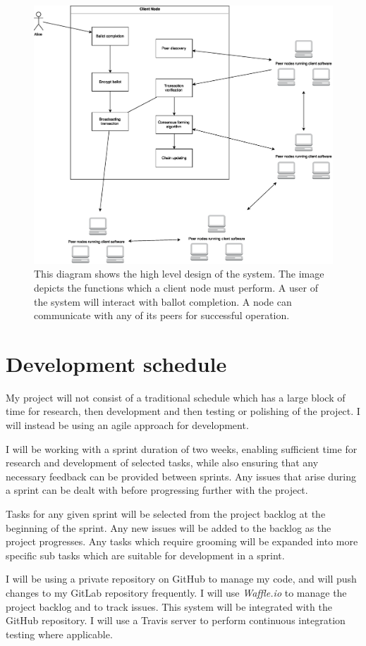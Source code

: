 \documentclass[a4paper,12pt]{article}
\begin{document}
\begin{figure}[ht]
\centering
\includegraphics[width=\textwidth]{HighLevelDesign.eps}
\caption{This diagram shows the high level design of the system. The image depicts the functions which a client node must perform. A user of the system will interact with ballot completion. A node can communicate with any of its peers for successful operation.}
\label{fig:high-level-design}
\end{figure}

\section{Development schedule}
My project will not consist of a traditional schedule which has a large block of time for research, then development and then testing or polishing of the project. I will instead be using an agile approach for development.

I will be working with a sprint duration of two weeks, enabling sufficient time for research and development of selected tasks, while also ensuring that any necessary feedback can be provided between sprints. Any issues that arise during a sprint can be dealt with before progressing further with the project.

Tasks for any given sprint will be selected from the project backlog at the beginning of the sprint. Any new issues will be added to the backlog as the project progresses. Any tasks which require grooming will be expanded into more specific sub tasks which are suitable for development in a sprint.

I will be using a private repository on GitHub to manage my code, and will push changes to my GitLab repository frequently. I will use \textit{Waffle.io} to manage the project backlog and to track issues. This system will be integrated with the GitHub repository. I will use a Travis server to perform continuous integration testing where applicable.

\newpage
\theendnotes
\end{document}
